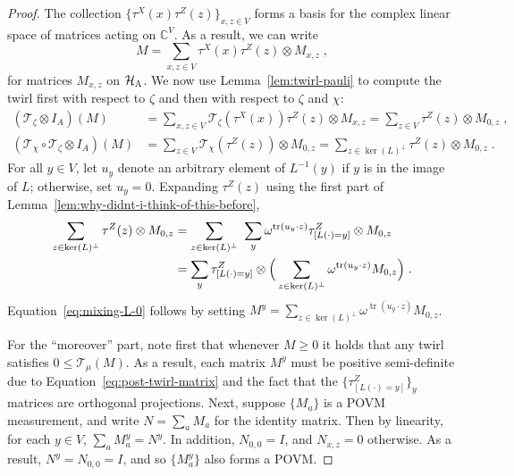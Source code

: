 \documentclass[11pt]{article}
\theoremstyle{definition}
\newcommand{\Id}{\ensuremath{I}}
\newcommand{\C}{\ensuremath{\mathbb{C}}}
\newcommand{\mH}{\ensuremath{\mathcal{H}}}
\DeclareMathOperator{\tr}{tr}
\newcommand{\labelstyle}[1]{\ensuremath{\textsc{#1}}\xspace}
\newcommand{\alice}{\labelstyle{A}}
\begin{document}
\begin{proof}
  The collection $\{\tau^X(x)\tau^Z(z)\}_{x, z \in V}$ forms a basis for the complex linear space   of matrices acting on $\C^V$.
  As a result, we can write
  \begin{equation*}
    M = \sum_{x, z \in V} \tau^X(x) \tau^Z(z) \otimes M_{x, z}\;,
  \end{equation*}
  for matrices $M_{x,z}$ on $\mH_\alice$.
  We now use Lemma~\ref{lem:twirl-pauli} to compute the twirl first with respect
  to $\zeta$ and then with respect to $\zeta$ and $\chi$:
  \begin{align*}
    (\mathscr{T}_{\zeta} \otimes \Id_{A})(M)
    &= \sum_{x, z \in V} \mathscr{T}_{\zeta}(\tau^X(x)) \tau^Z(z) \otimes M_{x, z}
      = \sum_{z \in V} \tau^Z(z) \otimes M_{0, z}\;,\\
    (\mathscr{T}_{\chi} \circ \mathscr{T}_{\zeta} \otimes \Id_{A})(M)
    &= \sum_{z \in V} \mathscr{T}_{\chi}(\tau^Z(z)) \otimes M_{0, z}
      =  \sum_{z \in \ker(L)^\perp} \tau^Z(z) \otimes M_{0, z}\;.
  \end{align*}
  For all $y \in V$, let $u_y$ denote an arbitrary element of $L^{-1}(y)$ if $y$
  is in the image of $L$; otherwise, set $u_y = 0$.
  Expanding $\tau^Z(z)$ using the first part of
  Lemma~\ref{lem:why-didnt-i-think-of-this-before},
  \begin{align}
    \label{eq:post-twirl-matrix}
    \sum_{z \in \ker(L)^\perp} \tau^Z(z) \otimes M_{0, z}
    & = \sum_{z \in \ker(L)^\perp} \,\, \sum_{y} \omega^{\tr(u_y \cdot z)}
      \tau^Z_{[L(\cdot)=y]} \otimes M_{0, z} \notag \\
    & =  \sum_{y} \tau^Z_{[L(\cdot)=y]} \otimes \Big(\sum_{z \in \ker(L)^\perp}
      \omega^{\tr(u_y \cdot z)}  M_{0, z}\Big)\;.
  \end{align}
  Equation~\eqref{eq:mixing-L-0} follows by setting $M^y = \sum_{z \in
    \ker(L)^\perp} \omega^{\tr(u_y \cdot z)} M_{0, z}$.

  For the ``moreover'' part, note first that whenever $M \geq 0$ it holds that
  any twirl satisfies $0 \leq \mathscr{T}_{\mu}(M)$.
  As a result, each matrix $M^y$ must be positive semi-definite due to
  Equation~\eqref{eq:post-twirl-matrix} and the fact that the
  $\{\tau^Z_{[L(\cdot)=y]}\}_y$ matrices are orthogonal projections.
  Next, suppose $\{M_a\}$ is a POVM measurement, and write $N = \sum_a M_a$ for
  the identity matrix.
  Then by linearity, for each $y \in V$, $\sum_a M_a^y = N^y$.
  In addition, $N_{0, 0} = \Id$, and $N_{x, z} = 0$ otherwise.
  As a result, $N^y = N_{0, 0} = \Id$, and so $\{M_a^y\}$ also forms a POVM.
\end{proof}
\end{document}
